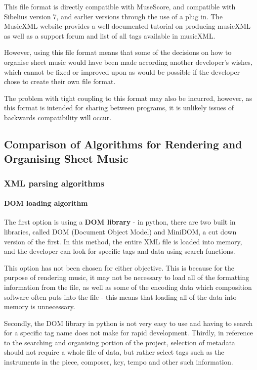 This file format is directly compatible with MuseScore, \parencite{MuseTour} and compatible with Sibelius version 7, and earlier versions through the use of a plug in. \parencite{Plugin} The MusicXML website provides a well documented tutorial on producing musicXML as well as a support forum and list of all tags available in musicXML.

However, using this file format means that some of the decisions on how to organise sheet music would have been made according another developer's wishes, which cannot be fixed or improved upon as would be possible if the developer chose to create their own file format.

The problem with tight coupling to this format may also be incurred, however, as this format is intended for sharing between programs, it is unlikely issues of backwards compatibility will occur.

\subsection{Comparison of Algorithms for Rendering and Organising Sheet Music}
\subsubsection{XML parsing algorithms}
\paragraph{DOM loading algorithm}
The first option is using a \textbf{DOM library} - in python, there are two built in libraries, called DOM (Document Object Model) and MiniDOM, a cut down version of the first. In this method, the entire XML file is loaded into memory, and the developer can look for specific tags and data using search functions.

This option has not been chosen for either objective. This is because for the purpose of rendering music, it may not be necessary to load all of the formatting information from the file, as well as some of the encoding data which composition software often puts into the file - this means that loading all of the data into memory is unnecessary. 

Secondly, the DOM library in python is not very easy to use and having to search for a specific tag name does not make for rapid development.
Thirdly, in reference to the searching and organising portion of the project, selection of metadata should not require a whole file of data, but rather select tags such as the instruments in the piece, composer, key, tempo and other such information.

